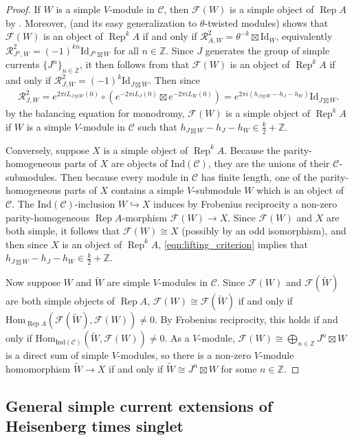 \documentclass[11pt, reqno]{amsart}
\theoremstyle{definition}\newtheorem{defi}[thm]{Definition}
\theoremstyle{definition}\newtheorem{rem}[thm]{Remark}
\theoremstyle{definition}\newtheorem{exam}[thm]{Example}
\theoremstyle{definition}\newtheorem{assum}[thm]{Assumption}
\newcommand{\cR}{\mathcal{R}}
\newcommand{\cF}{\mathcal{F}}
\newcommand{\cC}{\mathcal{C}}
\newcommand{\til}{\widetilde}
\newcommand{\ZZ}{\mathbb{Z}}
\newcommand{\Id}{\mathrm{Id}}
\newcommand{\tens}{\boxtimes}
\newcommand{\ind}{\mathrm{Ind}}
\DeclareMathOperator{\rep}{Rep}
\newcommand{\repA}{\rep A}
\begin{document}
\begin{proof}
If $W$ is a simple $V$-module in $\cC$, then $\cF(W)$ is a simple object of $\repA$ by \cite[Proposition 4.4]{CKM-exts}. Moreover, \cite[Proposition 2.65]{CKM-exts} (and its easy generalization to $\theta$-twisted modules) shows that $\cF(W)$ is an object of $\rep^kA$ if and only if $\cR_{A,W}^2=\theta^{-k}\tens\Id_W$, equivalently $\cR_{J^n,W}^2=(-1)^{kn}\Id_{J^n\tens W}$ for all $n\in\ZZ$. Since $J$ generates the group of simple currents $\lbrace J^n\rbrace_{n\in\ZZ}$, it then follows from \cite[Theorem 2.11(2)]{CKL} that $\cF(W)$ is an object of $\rep^kA$ if and only if $\cR^2_{J,W}=(-1)^k\Id_{J\tens W}$. Then since
\begin{align}\label{eqn:lifting_criterion}
\cR_{J,W}^2=e^{2\pi i L_{J\tens W}(0)}\circ(e^{-2\pi i L_J(0)}\tens e^{-2\pi i L_W(0)}) =e^{2\pi i(h_{J\tens W}-h_J-h_W)}\Id_{J\tens W}.
\end{align}
by the balancing equation for monodromy, $\cF(W)$ is a simple object of $\rep^kA$ if $W$ is a simple $V$-module in $\cC$ such that $h_{J\tens W}-h_J-h_W\in\frac{k}{2}+\ZZ$.

Conversely, suppose $X$ is a simple object of $\rep^kA$. Because the parity-homogeneous parts of $X$ are objects of $\ind(\cC)$, they are the unions of their $\cC$-submodules. Then because every module in $\cC$ has finite length, one of the parity-homogeneous parts of $X$ contains a simple $V$-submodule $W$ which is an object of $\cC$. The $\ind(\cC)$-inclusion $W\hookrightarrow X$ induces by Frobenius reciprocity a non-zero parity-homogeneous $\repA$-morphism $\cF(W)\rightarrow X$. Since $\cF(W)$ and $X$ are both simple, it follows that $\cF(W)\cong X$ (possibly by an odd isomorphism), and then since $X$ is an object of $\rep^kA$, \eqref{eqn:lifting_criterion} implies that $h_{J\tens W}-h_J-h_W\in\frac{k}{2}+\ZZ$.

Now suppose $W$ and $\til{W}$ are simple $V$-modules in $\cC$. Since $\cF(W)$ and $\cF(\til{W})$ are both simple objects of $\repA$, $\cF(W)\cong\cF(\til{W})$ if and only if $\mathrm{Hom}_{\repA}(\cF(\til{W}),\cF(W))\neq 0$. By Frobenius reciprocity, this holds if and only if $\mathrm{Hom}_{\ind(\cC)}(\til{W},\cF(W))\neq 0$. As a $V$-module, $\cF(W)\cong\bigoplus_{n\in\ZZ} J^n\tens W$ is a direct sum of simple $V$-modules, so there is a non-zero $V$-module homomorphism $\til{W}\rightarrow X$ if and only if $\til{W}\cong J^n\tens W$ for some $n\in\ZZ$.
\end{proof}

\subsection{General simple current extensions of Heisenberg times singlet}
\end{document}
